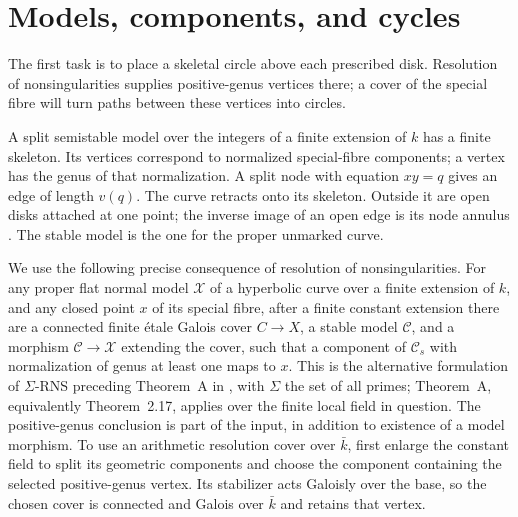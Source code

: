 \section{Models, components, and cycles}

The first task is to place a skeletal circle above each prescribed disk.
Resolution of nonsingularities supplies positive-genus vertices there;
a cover of the special fibre will turn paths between these vertices
into circles.

A split semistable model over the integers of a finite extension of
$k$ has a finite skeleton. Its vertices correspond to normalized
special-fibre components; a vertex has the genus of that normalization.
A split node with equation $xy=q$ gives an edge of length $v(q)$.
The curve retracts onto its skeleton. Outside it are open disks attached
at one point; the inverse image of an open edge is its node annulus
\cite[Sections~2.3 and~4]{BakerPayneRabinoff}.
The stable model is the one for the proper unmarked curve.

We use the following precise consequence of resolution of
nonsingularities. For any proper flat normal model $\mathcal X$ of a
hyperbolic curve over a finite extension of $k$, and any closed point
$x$ of its special fibre, after a finite constant extension there are
a connected finite \'etale Galois cover $C\to X$, a stable model
$\mathcal C$, and a morphism $\mathcal C\to\mathcal X$ extending
the cover, such that a component of $\mathcal C_s$ with normalization
of genus at least one maps to $x$. This is the alternative formulation
of $\Sigma$-RNS preceding Theorem~A in
\cite{MochizukiTsujimura}, with $\Sigma$ the set of all primes;
Theorem~A, equivalently Theorem~2.17, applies over the finite local
field in question. The positive-genus conclusion is part of the input,
in addition to existence of a model morphism.
To use an arithmetic resolution cover over $\bar k$, first enlarge
the constant field to split its geometric components and choose the
component containing the selected positive-genus vertex. Its stabilizer
acts Galoisly over the base, so the chosen cover is connected and Galois
over $\bar k$ and retains that vertex.

